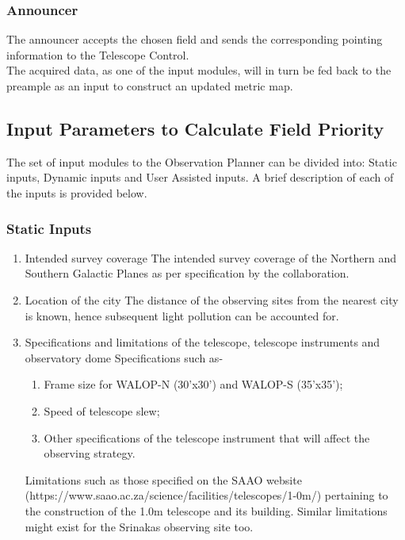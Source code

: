 \documentclass{article}
\begin{document}
\subsubsection{Announcer}
The announcer accepts the chosen field and sends the corresponding pointing information to the Telescope Control.\\The acquired data, as one of the input modules, will in turn be fed back to the preample as an input to construct an updated metric map.

\subsection{Input Parameters to Calculate Field Priority}
The set of input modules to the Observation Planner can be divided into: Static inputs, Dynamic inputs and User Assisted inputs. A brief description of each of the inputs is provided below.

\subsubsection{Static Inputs}
\begin{enumerate}
\item Intended survey coverage\newline
    The intended survey coverage of the Northern and Southern Galactic Planes as per specification by the collaboration.
\item Location of the city\newline
    The distance of the observing sites from the nearest city is known, hence subsequent light pollution can be accounted for. 
\item Specifications and limitations of the telescope, telescope instruments and observatory dome\newline
    Specifications such as-
    \begin{enumerate}
        \item Frame size for WALOP-N (30'x30') and WALOP-S (35'x35');
        \item Speed of telescope slew;
        \item Other specifications of the telescope instrument that will affect the observing strategy.
    \end{enumerate}
    Limitations such as those specified on the SAAO website \\(https://www.saao.ac.za/science/facilities/telescopes/1-0m/) pertaining to the construction of the 1.0m telescope and its building. Similar limitations might exist for the Srinakas 
    observing site too.
\end{enumerate}
\end{document}
